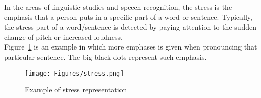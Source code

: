 In the areas of linguistic studies and speech recognition, the stress is the emphasis that a person puts in a specific part of a word or sentence. Typically, the stress part of a word/sentence is detected by paying attention to the sudden change of pitch or increased loudness. \\
\noindent Figure~\ref{fig:stress_ex} is an example in which more emphases is given when pronouncing that particular sentence. The big black dots represent such emphasis.

\begin{figure}[!ht]
	\centering
	\texttt{[image: Figures/stress.png]}
	\caption{Example of stress representation\footnotemark}
	\label{fig:stress_ex}
\end{figure}

